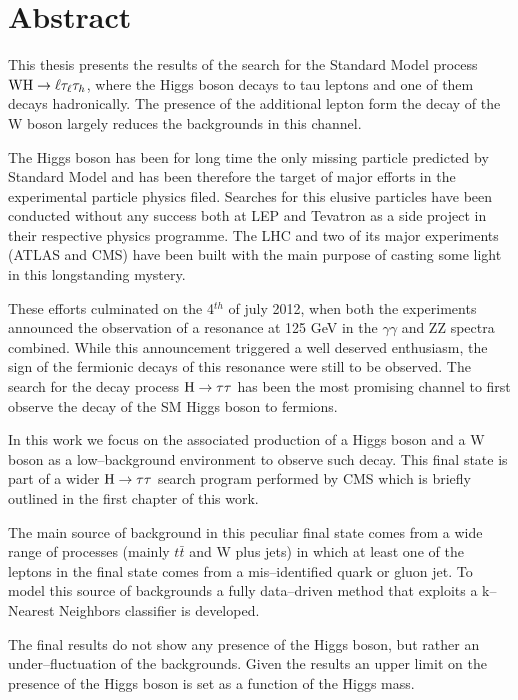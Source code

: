 \chapter*{Abstract}

This thesis presents the results of the search for the Standard Model process $\mathrm{W}\mathrm{H} \rightarrow \ell \tau_\ell \tau_h$, where the Higgs boson decays to tau leptons and one of them decays hadronically. The presence of the additional lepton form the decay of the W boson largely reduces the backgrounds in this channel.

The Higgs boson has been for long time the only missing particle predicted by Standard Model and has been therefore the target of major efforts in the experimental particle physics filed. Searches for this elusive particles have been conducted without any success both at LEP and Tevatron as a side project in their respective physics programme. The LHC and two of its major experiments (ATLAS and CMS) have been built with the main purpose of casting some light in this longstanding mystery. 

These efforts culminated on the 4$^{th}$ of july 2012, when both the experiments announced the observation of a resonance at 125 GeV in the $\gamma \gamma$ and ZZ spectra combined. While this announcement triggered a well deserved enthusiasm, the sign of the fermionic decays of this resonance were still to be observed. The search for the decay process $\mathrm{H} \rightarrow \tau \tau$ has been the most promising channel to first observe the decay of the SM Higgs boson to fermions. 

In this work we focus on the associated production of a Higgs boson and a W boson as a low--background environment to observe such decay. This final state is part of a wider $\mathrm{H} \rightarrow \tau \tau$ search program performed by CMS which is briefly outlined in the first chapter of this work. 

The main source of background in this peculiar final state comes from a wide range of processes (mainly $t\bar{t}$ and W plus jets) in which at least one of the leptons in the final state comes from a mis--identified quark or gluon jet. To model this source of backgrounds a fully data--driven method that exploits a k--Nearest Neighbors classifier is developed.

The final results do not show any presence of the Higgs boson, but rather an under--fluctuation of the backgrounds. Given the results an upper limit on the presence of the Higgs boson is set as a function of the Higgs mass.